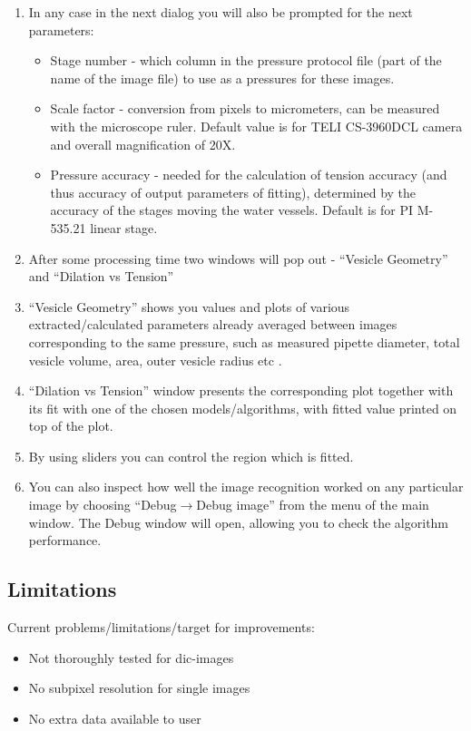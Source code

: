 \begin{enumerate}
	\item In any case in the next dialog you will also be prompted for the next parameters:
	\begin{itemize}
		\item Stage number - which column in the pressure protocol file (part of the name of the image file) to use as a pressures for these images.
		\item Scale factor - conversion from pixels to micrometers, can be measured with the microscope ruler. Default value is for TELI CS-3960DCL camera and overall magnification of 20X.
		\item Pressure accuracy - needed for the calculation of tension accuracy (and thus accuracy of output parameters of fitting), determined by the accuracy of the stages moving the water vessels. Default is for PI M-535.21 linear stage.
	\end{itemize}
	\item After some processing time two windows will pop out - ``Vesicle Geometry'' and ``Dilation vs Tension''
	\item ``Vesicle Geometry'' shows you values and plots of various extracted/calculated parameters already averaged between images corresponding to the same pressure, such as measured pipette diameter, total vesicle volume, area, outer vesicle radius etc  .
	\item ``Dilation vs Tension'' window presents the corresponding plot together with its fit with one of the chosen models/algorithms, with fitted value printed on top of the plot.
	\item By using sliders you can control the region which is fitted.
	\item You can also inspect how well the image recognition worked on any particular image by choosing ``Debug$\rightarrow$Debug image'' from the menu of the main window. The Debug window will open, allowing you to check the algorithm performance.
\end{enumerate}

\subsection{Limitations}\label{vampy-limits}
Current problems/limitations/target for improvements:
\begin{itemize}
	\item Not thoroughly tested for dic-images
	\item No subpixel resolution for single images
	\item No extra data available to user
\end{itemize}